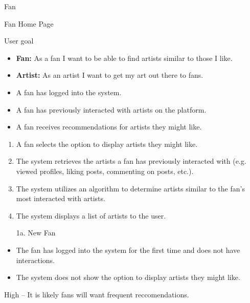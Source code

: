 \documentclass[11pt]{report}
\begin{document}
\begin{description}[leftmargin=2.2cm, style=nextline]
  \item[Primary Actor] Fan
  \item[Scope] Fan Home Page
  \item[Level] User goal
  \item[Stakeholders \& Interests]
    \begin{itemize}
      \item \textbf{Fan:} As a fan I want to be able to find artists similar to those I like.
      \item \textbf{Artist:} As an artist I want to get my art out there to fans.
    \end{itemize}
  \item[Preconditions]
    \begin{itemize}
      \item A fan has logged into the system.
      \item A fan has previously interacted with artists on the platform.

    \end{itemize}
  \item[Postconditions (Success Guarantee)]
    \begin{itemize}
      \item A fan receives recommendations for artists they might like.
    \end{itemize}
  \item[Main Success Scenario]
    \begin{enumerate}
      \item A fan selects the option to display artists they might like.
      \item The system retrieves the artists a fan has previously interacted with (e.g. viewed profiles, liking posts, commenting on posts, etc.).
      \item The system utilizes an algorithm to determine artists similar to the fan's most interacted with artists.
      \item The system displays a list of artists to the user.

    \end{enumerate}
  \item[Extensions]
    \begin{itemize}
      \item[1a.] New Fan
      \item The fan has logged into the system for the first time and does not have interactions.
      \item The system does not show the option to display artists they might like.
    \end{itemize}
  \item[Frequency of Occurrence] High -- It is likely fans will want frequent reccomendations.
\end{description}
\end{document}
